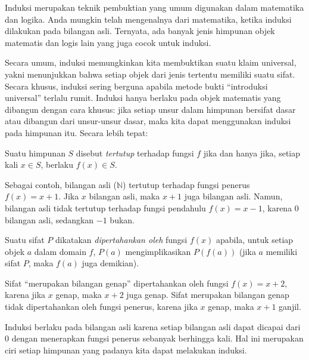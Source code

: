 \documentclass[../../../include/open-logic-section]{subfiles}
\begin{document}


\begin{explain}
Induksi merupakan teknik pembuktian yang umum digunakan dalam matematika dan
logika. Anda mungkin telah mengenalnya dari matematika, ketika induksi
dilakukan pada bilangan asli. Ternyata, ada banyak jenis himpunan objek
matematis dan logis lain yang juga cocok untuk induksi.

Secara umum, induksi memungkinkan kita membuktikan suatu klaim universal,
yakni menunjukkan bahwa setiap objek dari jenis tertentu memiliki suatu
sifat. Secara khusus, induksi sering berguna apabila metode bukti
``introduksi universal'' terlalu rumit. Induksi hanya berlaku pada objek
matematis yang dibangun dengan cara khusus: jika setiap unsur dalam himpunan
bersifat dasar atau dibangun dari unsur-unsur dasar, maka kita dapat
menggunakan induksi pada himpunan itu. Secara lebih tepat:
\end{explain}

\begin{defn}
Suatu himpunan $S$ disebut \emph{tertutup} terhadap fungsi $f$ jika dan hanya
jika, setiap kali $x \in S$, berlaku $f(x) \in S$.
\end{defn}

\begin{explain}
Sebagai contoh, bilangan asli ($\mathbb{N}$) tertutup terhadap fungsi penerus
$f(x) = x+1$. Jika $x$ bilangan asli, maka $x+1$ juga bilangan asli. Namun,
bilangan asli tidak tertutup terhadap fungsi pendahulu $f(x) = x-1$, karena
$0$ bilangan asli, sedangkan $-1$ bukan.
\end{explain}

\begin{defn}
Suatu sifat $P$ dikatakan \emph{dipertahankan oleh} fungsi $f(x)$ apabila,
untuk setiap objek $a$ dalam domain $f$, $P(a)$ mengimplikasikan $P(f(a))$
(jika $a$ memiliki sifat $P$, maka $f(a)$ juga demikian).
\end{defn}

\begin{explain}
Sifat ``merupakan bilangan genap'' dipertahankan oleh fungsi $f(x) = x+2$,
karena jika $x$ genap, maka $x+2$ juga genap. Sifat merupakan bilangan genap
tidak dipertahankan oleh fungsi penerus, karena jika $x$ genap, maka $x+1$
ganjil.

Induksi berlaku pada bilangan asli karena setiap bilangan asli dapat dicapai
dari 0 dengan menerapkan fungsi penerus sebanyak berhingga kali. Hal ini
merupakan ciri setiap himpunan yang padanya kita dapat melakukan induksi.
\end{explain}
\end{document}
